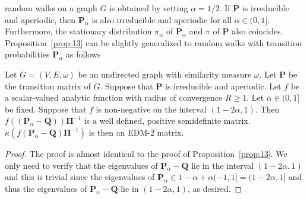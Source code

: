 random walks on a graph $G$ is obtained by setting $\alpha = 1/2$. If
$\mathbf{P}$ is irreducible and aperiodic, then
$\mathbf{P}_{\alpha}$ is also irreducible and aperiodic for
all $\alpha \in (0,1]$. Furthermore, the stationary distribution
$\pi_{\alpha}$ of $\mathbf{P}_{\alpha}$ and $\pi$ of $\mathbf{P}$ also
coincides. Proposition~\ref{prop:13} can be slightly 
generalized to random walks with transition probabilities
$\mathbf{P}_{\alpha}$ as follows
\begin{proposition}
  \label{prop:24}
  Let $G = (V,E,\omega)$ be an undirected graph with similarity
  measure $\omega$. Let $\mathbf{P}$ be the transition matrix of
  $G$. Suppose that $\mathbf{P}$ is irreducible and aperiodic.  Let
  $f$ be a scalar-valued analytic function with radius of convergence
  $R \geq 1$. Let $\alpha \in (0,1]$ be fixed. Suppose that $f$ is
  non-negative on the interval $(1 - 2\alpha,1)$. Then $f((\mathbf{P}_{\alpha}
  - \mathbf{Q}))\bm{\Pi}^{-1}$ is a well defined, positive
  semidefinite matrix. $\kappa(f(\mathbf{P}_{\alpha} -
  \mathbf{Q})\bm{\Pi}^{-1})$ is then an EDM-2 matrix.
\end{proposition}
\begin{proof}
  The proof is almost identical to the proof of Proposition~\ref{prop:13}. We
  only need to verify that the eigenvalues of $\mathbf{P}_{\alpha} - \mathbf{Q}$
  lie in the interval $(1 - 2\alpha, 1)$ and this is trivial since
  the eigenvalues of $\mathbf{P}_{\alpha} \in 1 - \alpha +
  \alpha(-1,1] = (1 - 2\alpha, 1]$ and thus the eigenvalues of
  $\mathbf{P}_{\alpha} - \mathbf{Q}$ lie in $(1 - 2\alpha, 1)$, as desired.
\end{proof}

